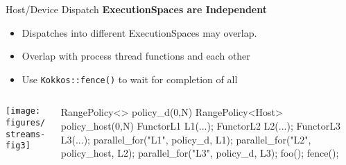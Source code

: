 \begin{frame}[fragile]{Host/Device Dispatch}
  \textbf{ExecutionSpaces are Independent}
  \begin{itemize}
    \item{Dispatches into different ExecutionSpaces may overlap.}
    \item{Overlap with process thread functions and each other}
    \item{Use \texttt{Kokkos::fence()} to wait for completion of all}
  \end{itemize}

  \begin{columns}[]
    \begin{column}{.67\textwidth}

       \texttt{[image: figures/streams-fig3]} 
 
    \end{column}

    \begin{column}{.33\textwidth}
	    \begin{code}[linebackgroundcolor={},keywords={L1,L2,L3,policy_device,policy_host}]
RangePolicy<> 
  policy_d(0,N)
RangePolicy<Host>
  policy_host(0,N)
FunctorL1 L1(...);
FunctorL2 L2(...);
FunctorL3 L3(...);
parallel_for("L1", 
  policy_d, L1);
parallel_for("L2", 
  policy_host, L2);
parallel_for("L3", 
  policy_d, L3);
foo();
fence();
      \end{code}
    \end{column}
  \end{columns}
\end{frame}


